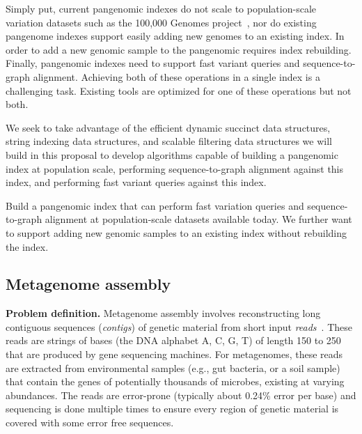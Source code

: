 Simply put, current pangenomic indexes do not scale to population-scale variation datasets such as the 100,000 Genomes project~\cite{1002021100}, nor do 
existing pangenome indexes support easily adding new genomes to an existing index. In order to add a new genomic sample to the pangenomic requires index rebuilding. Finally, pangenomic indexes need to support fast variant queries and sequence-to-graph alignment. Achieving both of these operations in a single index is a challenging task. Existing tools are optimized for one of these operations but not both.

We seek to take advantage of the efficient dynamic succinct data structures, string indexing data structures, and scalable filtering data structures we will build in this proposal to develop algorithms capable of building a pangenomic index at population scale, performing sequence-to-graph alignment against this index, and performing fast variant queries against this index.

\begin{rproblem}%
 Build a pangenomic index that can perform fast variation queries and sequence-to-graph alignment at population-scale datasets available today. We further want to support adding new genomic samples to an existing index without rebuilding the index.
\label{rprob:pangenomics}
\end{rproblem}


\subsection{Metagenome assembly}


\textbf{Problem definition.}
Metagenome assembly involves reconstructing long contiguous sequences (\emph{contigs}) of genetic material from short input \emph{reads}~\cite{yang2021review}. These reads are strings of bases (the DNA alphabet A, C, G, T) of length 150 to 250 that are produced by gene sequencing machines.
For metagenomes, these reads are extracted from environmental samples (e.g., gut bacteria, or a soil sample) that contain the genes of potentially thousands of microbes, existing at varying abundances.
The reads are error-prone (typically about 0.24\% error per base) and sequencing is done multiple times to ensure every region of genetic material is covered with some error free sequences.

